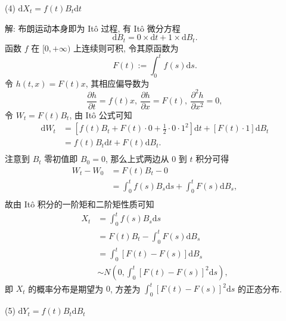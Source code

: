 \documentclass[openany]{ctexbook}
\theoremstyle{kaiti}
\theoremstyle{normal}
\begin{document}
(4) $\mathrm{d}X_t=f(t)B_t\mathrm{d}t$

解: 布朗运动本身即为 It\^o 过程, 有 It\^o 微分方程
\begin{equation}
  \mathrm{d}B_t=0\times\mathrm{d}t+1\times\mathrm{d}B_t.
\end{equation}
函数 $f$ 在 $[0,+\infty)$ 上连续则可积, 令其原函数为
\begin{equation}
  F(t):=\int_0^tf(s)\mathrm{d}s.
\end{equation}
令 $h(t,x)=F(t)x$, 其相应偏导数为
\begin{equation}
  \frac{\partial h}{\partial t}=f(t)x,~
  \frac{\partial h}{\partial x}=F(t),~
  \frac{\partial^2 h}{\partial x^2}=0,
\end{equation}
令 $W_t=F(t)B_t$, 由 It\^o 公式可知
\begin{equation}
  \begin{aligned}
    \mathrm{d}W_t
    &=\left[f(t)B_t+F(t)\cdot0+\frac{1}{2}\cdot0\cdot1^2\right]\mathrm{d}t+[F(t)\cdot1]\mathrm{d}B_t\\
    &=f(t)B_t\mathrm{d}t+F(t)\mathrm{d}B_t.\\
  \end{aligned}
\end{equation}
注意到 $B_t$ 零初值即 $B_0=0$, 那么上式两边从 $0$ 到 $t$ 积分可得
\begin{equation}
  \begin{aligned}
    W_t-W_0
    &=F(t)B_t-0\\
    &=\int_0^tf(s)B_s\mathrm{d}s+\int_0^tF(s)\mathrm{d}B_s,\\
  \end{aligned}
\end{equation}
故由 It\^o 积分的一阶矩和二阶矩性质可知
\begin{equation}
  \begin{aligned}
  X_t
  &=\int_0^tf(s)B_s\mathrm{d}s\\
  &=F(t)B_t-\int_0^tF(s)\mathrm{d}B_s\\
  &=\int_0^t[F(t)-F(s)]\mathrm{d}B_s\\
  &\sim N\left(0,\int_0^t[F(t)-F(s)]^2\mathrm{d}s\right),
  \end{aligned}
\end{equation}
即 $X_t$ 的概率分布是期望为 $0$, 方差为 $\displaystyle\int_0^t[F(t)-F(s)]^2\mathrm{d}s$ 的正态分布.

(5) $\mathrm{d}Y_t=f(t)B_t\mathrm{d}B_t$
\end{document}
